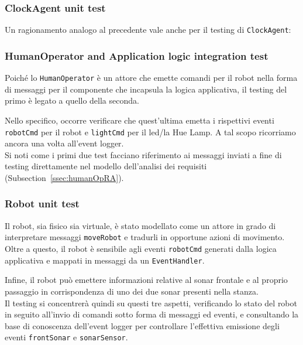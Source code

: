 \documentclass{../llncs}
\newcommand{\codescript}[1]{{\mbox{\small{\texttt{#1}}}}\xspace}
\newcommand{\xss}[1]{\subsectionname~\ref{ssec:#1}}
\newcommand{\subsectionname}{Subsection}
\begin{document}
\subsubsection{ClockAgent unit test}
Un ragionamento analogo al precedente vale anche per il testing di \codescript{ClockAgent}:\\



\subsubsection{HumanOperator and Application logic integration test}
Poiché lo \codescript{HumanOperator} è un attore che emette comandi per il robot nella forma di messaggi per il componente che incapsula la logica applicativa, il testing del primo è legato a quello della seconda.

Nello specifico, occorre verificare che quest'ultima emetta i rispettivi eventi \codescript{robotCmd} per il robot e \codescript{lightCmd} per il led/la Hue Lamp. A tal scopo ricorriamo ancora una volta all'event logger.\\



Si noti come i primi due test facciano riferimento ai messaggi inviati a fine di testing direttamente nel modello dell'analisi dei requisiti (\xss{humanOpRA}).

\subsubsection{Robot unit test}
Il robot, sia fisico sia virtuale, è stato modellato come un attore in grado di interpretare messaggi \codescript{moveRobot} e tradurli in opportune azioni di movimento. Oltre a questo, il robot è sensibile agli eventi \codescript{robotCmd} generati dalla logica applicativa e mappati in messaggi da un \codescript{EventHandler}.

Infine, il robot può emettere informazioni relative al sonar frontale e al proprio passaggio in corrispondenza di uno dei due sonar presenti nella stanza.\\

Il testing si concentrerà quindi su questi tre aspetti, verificando lo stato del robot in seguito all'invio di comandi sotto forma di messaggi ed eventi, e consultando la base di conoscenza dell'event logger per controllare l'effettiva emissione degli eventi \codescript{frontSonar} e \codescript{sonarSensor}.\\
\end{document}
